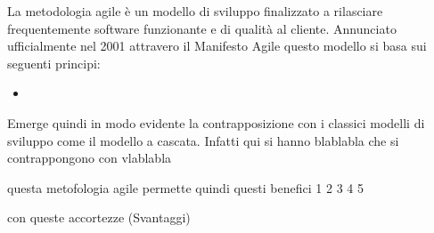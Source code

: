 La metodologia agile è un modello di sviluppo finalizzato a rilasciare frequentemente software funzionante e di qualità al cliente.
Annunciato ufficialmente nel 2001 attravero il Manifesto Agile questo modello si basa sui seguenti principi:
\begin{itemize}
    \itemsep0em
    \item 
\end{itemize}
Emerge quindi in modo evidente la contrapposizione con i classici modelli di sviluppo come il modello a cascata.
Infatti qui si hanno blablabla che si contrappongono con vlablabla

questa metofologia agile permette quindi questi benefici
1 2 3 4 5 

con queste accortezze (Svantaggi)

